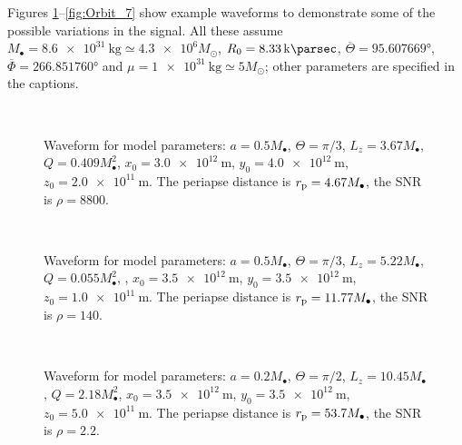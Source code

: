 Figures \ref{fig:Orbit_1}--\ref{fig:Orbit_7} show example waveforms to demonstrate some of the possible variations in the signal. All these assume $M_\bullet = \SI{8.6e31}{\kg} \simeq \num{4.3e6} M_\odot$, $R_0 = \SI{8.33}{\kilo\parsec}$, $\overline{\Theta} = \ang{95.607669}$, $\overline{\Phi} = \ang{266.851760}$ and $\mu = \SI{1e31}{\kg} \simeq 5 M_\odot$; other parameters are specified in the captions.
\begin{figure}[htbp]
  \begin{center}
    \quad
    \\
    \caption{Waveform for model parameters: $a = 0.5 M_\bullet$, $\Theta = \pi/3$, $L_z = 3.67 M_\bullet$, $Q = 0.409 M_\bullet^2$, $x_0 = \SI{3.0e12}{\metre}$, $y_0 = \SI{4.0e12}{\metre}$, $z_0 = \SI{2.0e11}{\metre}$. The periapse distance is $r_\mathrm{p} = 4.67 M_\bullet$, the SNR is $\rho = 8800$.}
    \label{fig:Orbit_1}
  \end{center}
\end{figure}
\begin{figure}[htbp]
  \begin{center}
    \quad
    \\
    \caption{Waveform for model parameters: $a = 0.5 M_\bullet$, $\Theta = \pi/3$, $L_z = 5.22 M_\bullet$, $Q = 0.055 M_\bullet^2$, , $x_0 = \SI{3.5e12}{\metre}$, $y_0 = \SI{3.5e12}{\metre}$, $z_0 = \SI{1.0e11}{\metre}$. The periapse distance is $r_\mathrm{p} = 11.77 M_\bullet$, the SNR is $\rho = 140$.}
    \label{fig:Orbit_2}
  \end{center}
\end{figure}
\begin{figure}[htbp]
  \begin{center}
    \quad
    \\
    \caption{Waveform for model parameters: $a = 0.2 M_\bullet$, $\Theta = \pi/2$, $L_z = 10.45 M_\bullet$, $Q = 2.18 M_\bullet^2$, $x_0 = \SI{3.5e12}{\metre}$, $y_0 = \SI{3.5e12}{\metre}$, $z_0 = \SI{5.0e11}{\metre}$. The periapse distance is $r_\mathrm{p} = 53.7 M_\bullet$, the SNR is $\rho = 2.2$.}
    \label{fig:Orbit_5}
  \end{center}
\end{figure}
